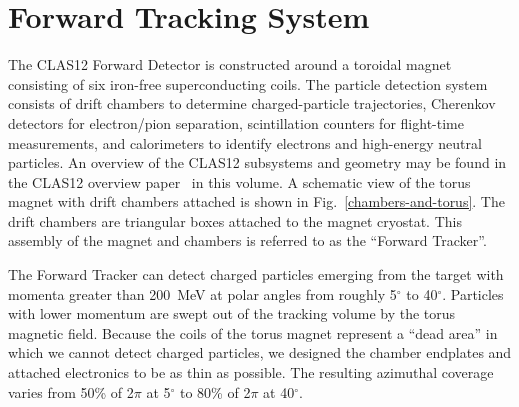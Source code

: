 \section{Forward Tracking System}
\label{overview}

The CLAS12 Forward Detector is constructed around a toroidal magnet consisting of six 
iron-free superconducting coils.  The particle detection system consists of drift 
chambers to determine charged-particle trajectories, Cherenkov detectors 
for electron/pion separation, scintillation counters for flight-time 
measurements, and calorimeters to identify electrons and high-energy neutral 
particles.  An overview of the CLAS12 subsystems and geometry may be found in the 
CLAS12 overview paper~\cite{clas12-nim} in this volume.  A schematic view of the 
torus magnet with drift chambers
attached is shown in Fig.~\ref{chambers-and-torus}.   The drift chambers are 
triangular boxes attached to the magnet cryostat.  
This assembly of the magnet and chambers is referred to as the ``Forward Tracker''. 

The Forward Tracker can detect charged particles emerging from the target with
momenta greater than 200~MeV at polar angles from roughly 5$^{\circ}$ to 
40$^{\circ}$.  Particles with lower momentum are swept out of the tracking
volume by the torus magnetic field.  
Because the coils of the torus magnet represent a ``dead area''
in which we cannot detect charged particles, we designed the chamber endplates
and attached electronics to be as thin as possible.  The resulting azimuthal
coverage varies from 50\% of 2$\pi$ at 5$^{\circ}$ to 80\% of 2$\pi$ at 40$^{\circ}$.

